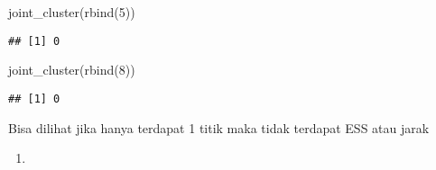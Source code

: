 \documentclass[
]{article}
\newenvironment{Shaded}{\begin{snugshade}}{\end{snugshade}}
\newcommand{\DecValTok}[1]{\textcolor[rgb]{0.00,0.00,0.81}{#1}}
\newcommand{\FunctionTok}[1]{\textcolor[rgb]{0.00,0.00,0.00}{#1}}
\newcommand{\NormalTok}[1]{#1}
\providecommand{\tightlist}{%
  \setlength{\itemsep}{0pt}\setlength{\parskip}{0pt}}
\begin{document}
\begin{Shaded}
\begin{Highlighting}[]
\FunctionTok{joint\_cluster}\NormalTok{(}\FunctionTok{rbind}\NormalTok{(}\DecValTok{5}\NormalTok{))}
\end{Highlighting}
\end{Shaded}

\begin{verbatim}
## [1] 0
\end{verbatim}

\begin{Shaded}
\begin{Highlighting}[]
\FunctionTok{joint\_cluster}\NormalTok{(}\FunctionTok{rbind}\NormalTok{(}\DecValTok{8}\NormalTok{))}
\end{Highlighting}
\end{Shaded}

\begin{verbatim}
## [1] 0
\end{verbatim}

Bisa dilihat jika hanya terdapat 1 titik maka tidak terdapat ESS atau
jarak

\begin{enumerate}
\def\labelenumi{\alph{enumi})}
\setcounter{enumi}{1}
\tightlist
\item
\end{enumerate}
\end{document}
